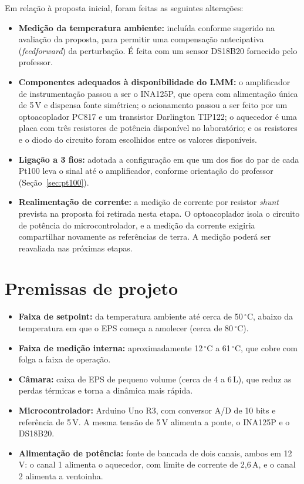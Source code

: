 \documentclass[a4paper,11pt]{article}
\begin{document}
Em relação à proposta inicial, foram feitas as seguintes alterações:

\begin{itemize}
  \item \textbf{Medição da temperatura ambiente:} incluída conforme sugerido na avaliação da proposta, para permitir uma compensação antecipativa (\textit{feedforward}) da perturbação. É feita com um sensor DS18B20 fornecido pelo professor.
  \item \textbf{Componentes adequados à disponibilidade do LMM:} o amplificador de instrumentação passou a ser o INA125P, que opera com alimentação única de 5\,V e dispensa fonte simétrica; o acionamento passou a ser feito por um optoacoplador PC817 e um transistor Darlington TIP122; o aquecedor é uma placa com três resistores de potência disponível no laboratório; e os resistores e o diodo do circuito foram escolhidos entre os valores disponíveis.
  \item \textbf{Ligação a 3 fios:} adotada a configuração em que um dos fios do par de cada Pt100 leva o sinal até o amplificador, conforme orientação do professor (Seção~\ref{sec:pt100}).
  \item \textbf{Realimentação de corrente:} a medição de corrente por resistor \textit{shunt} prevista na proposta foi retirada nesta etapa. O optoacoplador isola o circuito de potência do microcontrolador, e a medição da corrente exigiria compartilhar novamente as referências de terra. A medição poderá ser reavaliada nas próximas etapas.
\end{itemize}

\section{Premissas de projeto}

\begin{itemize}
  \item \textbf{Faixa de setpoint:} da temperatura ambiente até cerca de 50\,\ensuremath{^\circ}C, abaixo da temperatura em que o EPS começa a amolecer (cerca de 80\,\ensuremath{^\circ}C).
  \item \textbf{Faixa de medição interna:} aproximadamente 12\,\ensuremath{^\circ}C a 61\,\ensuremath{^\circ}C, que cobre com folga a faixa de operação.
  \item \textbf{Câmara:} caixa de EPS de pequeno volume (cerca de 4 a 6\,L), que reduz as perdas térmicas e torna a dinâmica mais rápida.
  \item \textbf{Microcontrolador:} Arduino Uno R3, com conversor A/D de 10 bits e referência de 5\,V. A mesma tensão de 5\,V alimenta a ponte, o INA125P e o DS18B20.
  \item \textbf{Alimentação de potência:} fonte de bancada de dois canais, ambos em 12\,V: o canal 1 alimenta o aquecedor, com limite de corrente de 2,6\,A, e o canal 2 alimenta a ventoinha.
\end{itemize}
\end{document}
